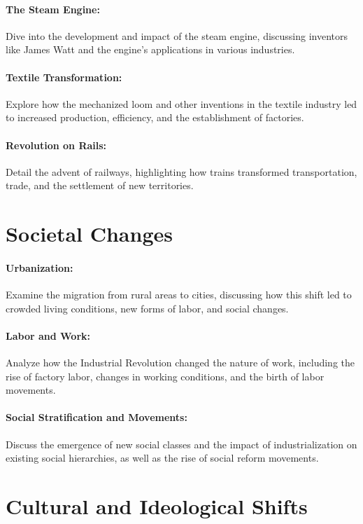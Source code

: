 \documentclass[a4paper,12pt]{book}
\begin{document}
\paragraph{The Steam Engine:}
Dive into the development and impact of the steam engine, discussing inventors like James Watt and the engine’s applications in various industries.

\paragraph{Textile Transformation:}
Explore how the mechanized loom and other inventions in the textile industry led to increased production, efficiency, and the establishment of factories.

\paragraph{Revolution on Rails:}
Detail the advent of railways, highlighting how trains transformed transportation, trade, and the settlement of new territories.

\section*{Societal Changes}

\paragraph{Urbanization:}
Examine the migration from rural areas to cities, discussing how this shift led to crowded living conditions, new forms of labor, and social changes.

\paragraph{Labor and Work:}
Analyze how the Industrial Revolution changed the nature of work, including the rise of factory labor, changes in working conditions, and the birth of labor movements.

\paragraph{Social Stratification and Movements:}
Discuss the emergence of new social classes and the impact of industrialization on existing social hierarchies, as well as the rise of social reform movements.

\section*{Cultural and Ideological Shifts}
\end{document}
